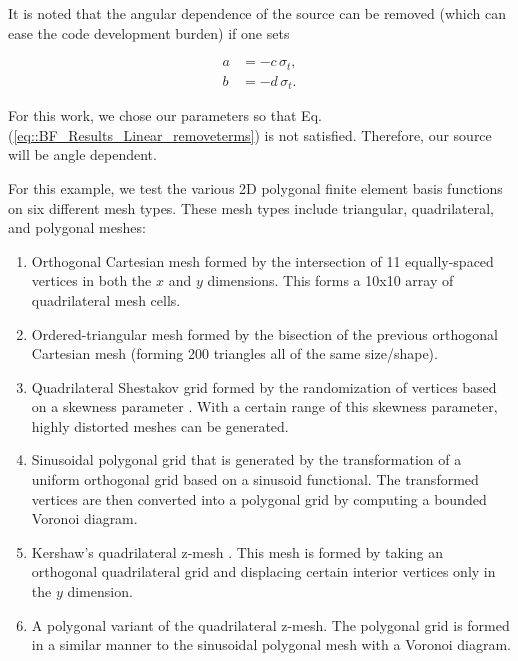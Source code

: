 \noindent It is noted that the angular dependence of the source can be removed (which can ease the code development burden) if one sets

\begin{equation}
\label{eq::BF_Results_Linear_removeterms}
\begin{aligned}
	a &= - c \, \sigma_t, \\
	b &= - d \, \sigma_t.
\end{aligned}
\end{equation}

\noindent For this work, we chose our parameters so that Eq. (\ref{eq::BF_Results_Linear_removeterms}) is not satisfied. Therefore, our source will be angle dependent.

For this example, we test the various 2D polygonal finite element basis functions on six different mesh types. These mesh types include triangular, quadrilateral, and polygonal meshes:

\begin{enumerate}
	\item Orthogonal Cartesian mesh formed by the intersection of 11 equally-spaced vertices in both the $x$ and $y$ dimensions. This forms a 10x10 array of quadrilateral mesh cells.
	\item Ordered-triangular mesh formed by the bisection of the previous orthogonal Cartesian mesh (forming 200 triangles all of the same size/shape).
	\item Quadrilateral Shestakov grid formed by the randomization of vertices based on a skewness parameter \cite{shestakov1988solution,shestakov1990test}. With a certain range of this skewness parameter, highly distorted meshes can be generated.
	\item Sinusoidal polygonal grid that is generated by the transformation of a uniform orthogonal grid based on a sinusoid functional. The transformed vertices are then converted into a polygonal grid by computing a bounded Voronoi diagram.
	\item Kershaw's quadrilateral z-mesh \cite{kershaw1981differencing}. This mesh is formed by taking an orthogonal quadrilateral grid and displacing certain interior vertices only in the $y$ dimension.
	\item A polygonal variant of the quadrilateral z-mesh. The polygonal grid is formed in a similar manner to the sinusoidal polygonal mesh with a Voronoi diagram.
\end{enumerate}

